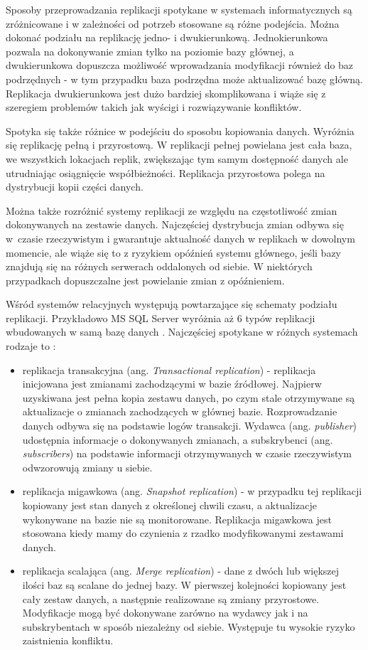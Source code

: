 \documentclass[a4paper,twoside,12pt]{book}
\newcommand{\obcy}[1]{\emph{#1}}
\newcommand{\ang}[1]{{\selectlanguage{british}\obcy{#1}}}
\begin{document}
Sposoby przeprowadzania replikacji spotykane w systemach informatycznych są zróżnicowane i w zależności od potrzeb stosowane są różne podejścia. Można dokonać podziału na replikację jedno- i dwukierunkową. Jednokierunkowa pozwala na dokonywanie zmian tylko na poziomie bazy głównej, a dwukierunkowa dopuszcza możliwość wprowadzania modyfikacji również do baz podrzędnych - w tym przypadku baza podrzędna może aktualizować bazę główną. Replikacja dwukierunkowa jest dużo bardziej skomplikowana i wiąże się z szeregiem problemów takich jak wyścigi i rozwiązywanie konfliktów. 

Spotyka się także różnice w podejściu do sposobu kopiowania danych. Wyróżnia się replikację pełną i przyrostową. W replikacji pełnej powielana jest cała baza, we wszystkich lokacjach replik, zwiększając tym samym dostępność danych ale utrudniając osiągnięcie współbieżności. Replikacja przyrostowa polega na dystrybucji kopii części danych.

Można także rozróżnić systemy replikacji ze względu na częstotliwość zmian dokonywanych na zestawie danych. Najczęściej dystrybucja zmian odbywa się w~czasie rzeczywistym i gwarantuje aktualność danych w replikach w dowolnym momencie, ale wiąże się to z ryzykiem opóźnień systemu głównego, jeśli bazy znajdują się na różnych serwerach oddalonych od siebie. W niektórych przypadkach dopuszczalne jest powielanie zmian z opóźnieniem. 

Wśród systemów relacyjnych występują powtarzające się schematy podziału replikacji. Przykładowo MS SQL Server wyróżnia aż 6 typów replikacji wbudowanych w samą bazę danych \cite{bib:microsoft-sql-server-replication-types}. Najczęściej spotykane w różnych systemach rodzaje to \cite{bib:database-replication-article}: 

\begin{itemize}
\item replikacja transakcyjna (ang. \ang{Transactional replication}) - replikacja inicjowana jest zmianami zachodzącymi w bazie źródłowej. Najpierw uzyskiwana jest pełna kopia zestawu danych, po czym stale otrzymywane są aktualizacje o zmianach zachodzących w głównej bazie. Rozprowadzanie danych odbywa się na podstawie logów transakcji. Wydawca (ang. \ang{publisher}) udostępnia informacje o dokonywanych zmianach, a subskrybenci (ang. \ang{subscribers}) na podstawie informacji otrzymywanych w czasie rzeczywistym odwzorowują zmiany u siebie.
\item replikacja migawkowa (ang. \ang{Snapshot replication}) - w przypadku tej replikacji kopiowany jest stan danych z określonej chwili czasu, a aktualizacje wykonywane na bazie nie są monitorowane. Replikacja migawkowa jest stosowana kiedy mamy do czynienia z rzadko modyfikowanymi zestawami danych.
\item replikacja scalająca (ang. \ang{Merge replication}) - dane z dwóch lub większej ilości baz są scalane do jednej bazy. W pierwszej kolejności kopiowany jest cały zestaw danych, a następnie realizowane są zmiany przyrostowe. Modyfikacje mogą być dokonywane zarówno na wydawcy jak i na subskrybentach w sposób niezależny od siebie. Występuje tu wysokie ryzyko zaistnienia konfliktu. 
\end{itemize}
\end{document}
